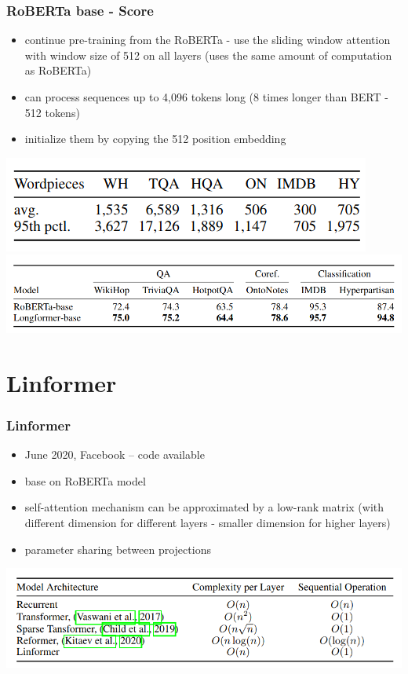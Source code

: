 \documentclass{beamer}
\begin{document}
\begin{frame}
    \frametitle{RoBERTa base - Score}
    \begin{itemize}
        \item continue pre-training from the RoBERTa - use the sliding window attention with window size of 512 on all layers (uses the same amount of computation as RoBERTa)
        \item can process sequences up to 4,096 tokens long (8 times longer than BERT - 512 tokens)
        \item initialize them by copying the 512 position embedding
    \end{itemize}
    \begin{center}
        \includegraphics[scale=0.4]{img/longformer_roberta_seq_size.png}
        \includegraphics[scale=0.3]{img/longformer_roberta_score.png}
    \end{center}
\end{frame}




\section{Linformer}
\begin{frame}
    \frametitle{Linformer \cite{linformer}}
    \begin{itemize}
        \item June 2020, Facebook -- code available
        \item base on RoBERTa model
        \item self-attention mechanism can be approximated by a low-rank matrix (with different dimension for different layers - smaller dimension for higher layers)
        \item parameter sharing between projections
    \end{itemize}
    \begin{center}
        \includegraphics[scale=0.4]{img/linformer_complexity.png}
    \end{center}
\end{frame}
\end{document}
